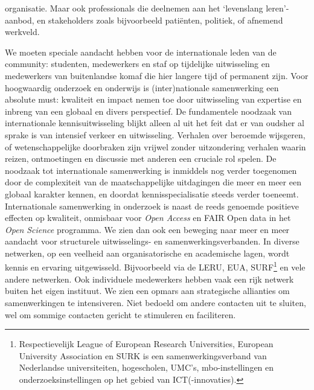 \documentclass[smallauthor, chapterhaspagenum, nochapterinheader, pagenuminheader,  bigchapnum,medium2, tocpages,  garamond, titleinheader]{jote-book}
\begin{document}
organisatie. Maar ook professionals die deelnemen aan het ‘levenslang leren'-aanbod, en stakeholders zoals bijvoorbeeld patiënten, politiek, of afnemend werkveld.



	We moeten speciale aandacht hebben voor de internationale leden van de community: studenten, medewerkers en staf op tijdelijke uitwisseling en medewerkers van buitenlandse komaf die hier langere tijd of permanent zijn. Voor hoogwaardig onderzoek en onderwijs is (inter)nationale samenwerking een absolute must: kwaliteit en impact nemen toe door uitwisseling van expertise en inbreng van een globaal en divers perspectief. De fundamentele noodzaak van internationale kennisuitwisseling blijkt alleen al uit het feit dat er van oudsher al sprake is van intensief verkeer en uitwisseling. Verhalen over beroemde wijsgeren, of wetenschappelijke doorbraken zijn vrijwel zonder uitzondering verhalen waarin reizen, ontmoetingen en discussie met anderen een cruciale rol spelen. De noodzaak tot internationale samenwerking is inmiddels nog verder toegenomen door de complexiteit van de maatschappelijke uitdagingen die meer en meer een globaal karakter kennen, en doordat kennisspecialisatie steeds verder toeneemt. Internationale samenwerking in onderzoek is naast de reeds genoemde positieve effecten op kwaliteit, onmisbaar voor \emph{Open Access} en FAIR Open data in het \emph{Open }\emph{Science} programma. We zien dan ook een beweging naar meer en meer aandacht voor structurele uitwisselings- en samenwerkingsverbanden. In diverse netwerken, op een veelheid aan organisatorische en academische lagen, wordt kennis en ervaring uitgewisseld. Bijvoorbeeld via de LERU, EUA, SURF\footnote{Respectievelijk League of European Research Universities, European University Association en SURK is een samenwerkingsverband van Nederlandse universiteiten, hogescholen, UMC's, mbo-instellingen en onderzoeksinstellingen op het gebied van ICT(-innovaties).} en vele andere netwerken. Ook individuele medewerkers hebben vaak een rijk netwerk buiten het eigen instituut. We zien een opmars aan strategische allianties om samenwerkingen te intensiveren. Niet bedoeld om andere contacten uit te sluiten, wel om sommige contacten gericht te stimuleren en faciliteren.
\end{document}
